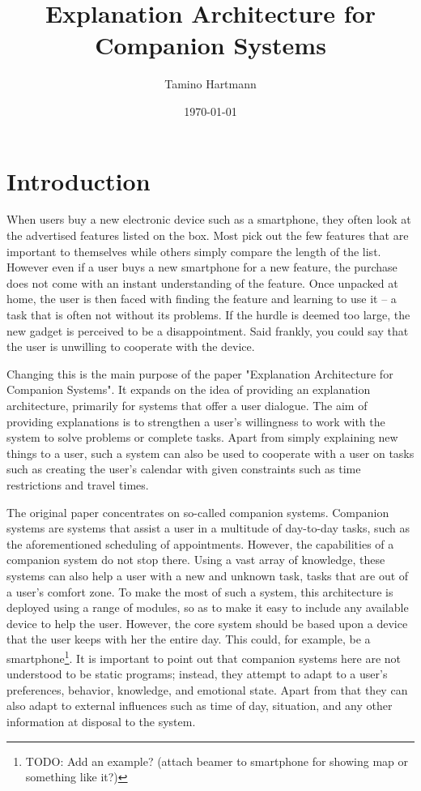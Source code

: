 \documentclass[a4paper]{article}
\begin{document}
\title{Explanation Architecture for Companion Systems}
\author{Tamino Hartmann}
\date{\today}

\maketitle
\newpage

\tableofcontents

\newpage

\section{Introduction}

When users buy a new electronic device such as a smartphone, they often look at the advertised features listed on the box. Most pick out the few features that are important to themselves while others simply compare the length of the list. However even if a user buys a new smartphone for a new feature, the purchase does not come with an instant understanding of the feature. Once unpacked at home, the user is then faced with finding the feature and learning to use it – a task that is often not without its problems. If the hurdle is deemed too large, the new gadget is perceived to be a disappointment. Said frankly, you could say that the user is unwilling to cooperate with the device.

Changing this is the main purpose of the paper "Explanation Architecture for Companion Systems"\cite{origin}. It expands on the idea of providing an explanation architecture, primarily for systems that offer a user dialogue. The aim of providing explanations is to strengthen a user's willingness to work with the system to solve problems or complete tasks. Apart from simply explaining new things to a user, such a system can also be used to cooperate with a user on tasks such as creating the user's calendar with given constraints such as time restrictions and travel times.

The original paper concentrates on so-called companion systems. Companion systems are systems that assist a user in a multitude of day-to-day tasks, such as the aforementioned scheduling of appointments. However, the capabilities of a companion system do not stop there. Using a vast array of knowledge, these systems can also help a user with a new and unknown task, tasks that are out of a user's comfort zone. To make the most of such a system, this architecture is deployed using a range of modules, so as to make it easy to include any available device to help the user. However, the core system should be based upon a device that the user keeps with her the entire day. This could, for example, be a smartphone\footnote{TODO: Add an example? (attach beamer to smartphone for showing map or something like it?)}. It is important to point out that companion systems here are not understood to be static programs; instead, they attempt to adapt to a user's preferences, behavior, knowledge, and emotional state. Apart from that they can also adapt to external influences such as time of day, situation, and any other information at disposal to the system.
\end{document}
